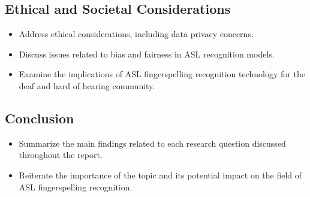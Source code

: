 \subsection{Ethical and Societal Considerations}

\begin{itemize}
    \item Address ethical considerations, including data privacy concerns.
    \item Discuss issues related to bias and fairness in ASL recognition models.
    \item Examine the implications of ASL fingerspelling recognition technology for the deaf and hard of hearing community.
\end{itemize}

\subsection{Conclusion}

\begin{itemize}
    \item Summarize the main findings related to each research question discussed throughout the report.
    \item Reiterate the importance of the topic and its potential impact on the field of ASL fingerspelling recognition.
\end{itemize}